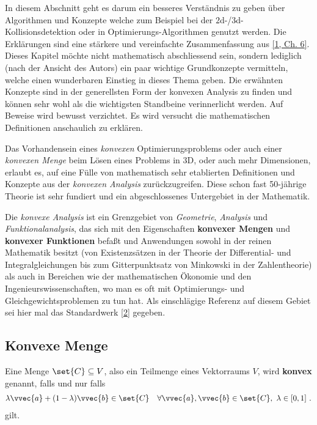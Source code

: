 \documentclass[
  12pt,
  british,
  paper=a4,
  twoside,
  titlepage=true,
  openright,
  abstract=on,
  toc=listofnumbered,
  numbers=noenddot,
  chapterprefix=true,
  headings=optiontohead,
  svgnames,
  dvipsnames]{scrreprt}
\begin{document}
In diesem Abschnitt geht es darum ein besseres Verständnis zu geben über
Algorithmen und Konzepte welche zum Beispiel bei der
\(2\)d-/\(3\)d-Kollisionsdetektion oder in Optimierungs-Algorithmen
genutzt werden. Die Erklärungen sind eine stärkere und vereinfachte
Zusammenfassung aus \protect\hyperlink{ref-nuetzig_thesis_2016}{{[}1,
Ch. 6{]}}. Dieses Kapitel möchte nicht mathematisch abschliessend sein,
sondern lediglich (nach der Ansicht des Autors) ein paar wichtige
Grundkonzepte vermitteln, welche einen wunderbaren Einstieg in dieses
Thema geben. Die erwähnten Konzepte sind in der generellsten Form der
konvexen Analysis zu finden und können sehr wohl als die wichtigsten
Standbeine verinnerlicht werden. Auf Beweise wird bewusst verzichtet. Es
wird versucht die mathematischen Definitionen anschaulich zu erklären.

Das Vorhandensein eines \emph{konvexen} Optimierungsproblems oder auch
einer \emph{konvexen Menge} beim Lösen eines Problems in \(3\)D, oder
auch mehr Dimensionen, erlaubt es, auf eine Fülle von mathematisch sehr
etablierten Definitionen und Konzepte aus der \emph{konvexen Analysis}
zurückzugreifen. Diese schon fast 50-jährige Theorie ist sehr fundiert
und ein abgeschlossenes Untergebiet in der Mathematik.

Die \emph{konvexe Analysis} ist ein Grenzgebiet von \emph{Geometrie},
\emph{Analysis} und \emph{Funktionalanalysis}, das sich mit den
Eigenschaften \textbf{konvexer Mengen} und \textbf{konvexer Funktionen}
befaßt und Anwendungen sowohl in der reinen Mathematik besitzt (von
Existenzsätzen in der Theorie der Differential- und Integralgleichungen
bis zum Gitterpunktsatz von Minkowski in der Zahlentheorie) als auch in
Bereichen wie der mathematischen Ökonomie und den
Ingenieurswissenschaften, wo man es oft mit Optimierungs- und
Gleichgewichtsproblemen zu tun hat. Als einschlägige Referenz auf diesem
Gebiet sei hier mal das Standardwerk
\protect\hyperlink{ref-rockafellar_convex_2015}{{[}2{]}} gegeben.

\hypertarget{konvexe-menge}{%
\subsection{Konvexe Menge}\label{konvexe-menge}}

Eine Menge \(\set{C} \subseteq V\), also ein Teilmenge eines Vektorraums
\(V\), wird \textbf{konvex} genannt, falls und nur falls
\begin{align} \lambda \vvec{a} + (1-\lambda) \vvec{b} \in \set{C} \quad \forall \vvec{a},\vvec{b} \in \set{C}, \ \lambda \in [0,1] \ . \end{align}
gilt.
\end{document}
